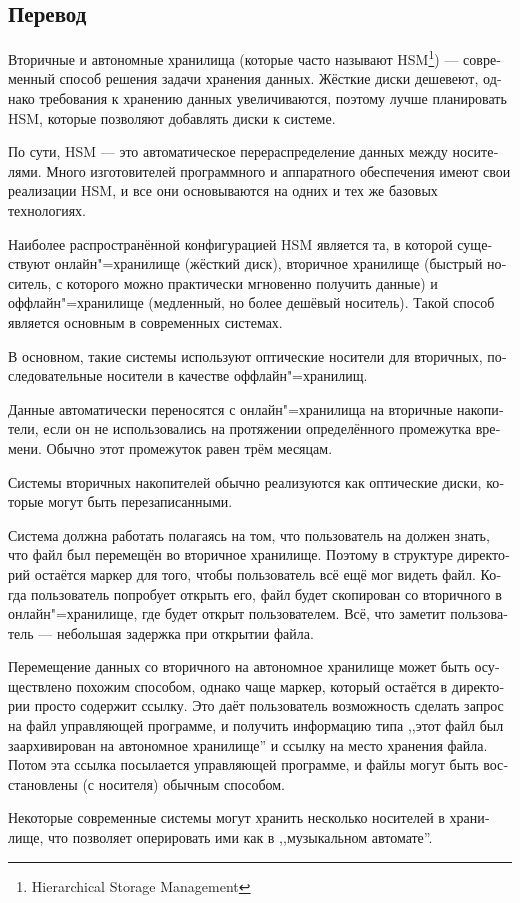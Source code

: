 \documentclass[a5paper,10pt,notitlepage,pdftex,headsepline]{scrartcl}
\begin{document}
  \subsection{Перевод}
    \begin{otherlanguage}{russian}
      Вторичные и автономные хранилища (которые часто называют
      HSM\footnote{Hierarchical Storage Management}) --- современный способ
      решения задачи хранения данных.
      Жёсткие диски дешевеют, однако требования к хранению данных увеличиваются,
      поэтому лучше планировать HSM, которые позволяют добавлять диски к
      системе.

      По сути, HSM --- это автоматическое перераспределение данных между
      носителями.
      Много изготовителей программного и аппаратного обеспечения имеют свои
      реализации HSM, и все они основываются на одних и тех же базовых
      технологиях.

      Наиболее распространённой конфигурацией HSM является та, в которой
      существуют онлайн"=хранилище (жёсткий диск), вторичное хранилище
      (быстрый носитель, с которого можно практически мгновенно получить
      данные) и оффлайн"=хранилище (медленный, но более дешёвый носитель).
      Такой способ является основным в современных системах.

      В основном, такие системы используют оптические носители для вторичных,
      последовательные носители в качестве оффлайн"=хранилищ.

      Данные автоматически переносятся с онлайн"=хранилища на вторичные
      накопители, если он не использовались на протяжении определённого
      промежутка времени.
      Обычно этот промежуток равен трём месяцам.

      Системы вторичных накопителей обычно реализуются как оптические
      диски, которые могут быть перезаписанными.

      Система должна работать полагаясь на том, что пользователь на должен
      знать, что файл был перемещён во вторичное хранилище.
      Поэтому в структуре директорий остаётся маркер для того, чтобы
      пользователь всё ещё мог видеть файл.
      Когда пользователь попробует открыть его, файл будет скопирован со
      вторичного в онлайн"=хранилище, где будет открыт пользователем.
      Всё, что заметит пользователь --- небольшая задержка при открытии файла.

      Перемещение данных со вторичного на автономное хранилище может быть
      осуществлено похожим способом, однако чаще маркер, который остаётся в
      директории просто содержит ссылку.
      Это даёт пользователь возможность сделать запрос на файл управляющей
      программе, и получить информацию типа ,,этот файл был заархивирован на
      автономное хранилище'' и ссылку на место хранения файла.
      Потом эта ссылка посылается управляющей программе, и файлы могут быть
      восстановлены (с носителя) обычным способом.

      Некоторые современные системы могут хранить несколько носителей в
      хранилище, что позволяет оперировать ими как в ,,музыкальном автомате''.
  \end{otherlanguage}
\end{document}
